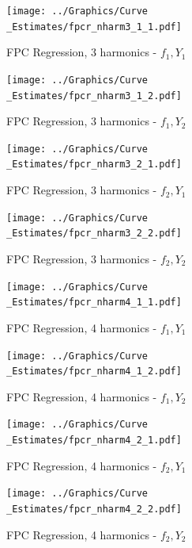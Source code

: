 \documentclass[11pt,twoside,a4paper]{article}
\begin{document}
	\begin{figure}[H]
		\centering
		\begin{minipage}{.5\textwidth}
			\centering
			\texttt{[image: ../Graphics/Curve\\\_Estimates/fpcr\_nharm3\_1\_1.pdf]}
			\caption{FPC Regression, 3 harmonics - $f_1, Y_1$}
			\label{fpcr_nharm3_1_1}
		\end{minipage}%
		\begin{minipage}{.5\textwidth}
			\centering
			\texttt{[image: ../Graphics/Curve\\\_Estimates/fpcr\_nharm3\_1\_2.pdf]}
			\caption{FPC Regression, 3 harmonics - $f_1, Y_2$}
			\label{fpcr_nharm3_1_2}
		\end{minipage}
	\end{figure}
	
	\begin{figure}[H]
		\centering
		\begin{minipage}{.5\textwidth}
			\centering
			\texttt{[image: ../Graphics/Curve\\\_Estimates/fpcr\_nharm3\_2\_1.pdf]}
			\caption{FPC Regression, 3 harmonics - $f_2, Y_1$}
			\label{fpcr_nharm3_2_1}
		\end{minipage}%
		\begin{minipage}{.5\textwidth}
			\centering
			\texttt{[image: ../Graphics/Curve\\\_Estimates/fpcr\_nharm3\_2\_2.pdf]}
			\caption{FPC Regression, 3 harmonics - $f_2, Y_2$}
			\label{fpcr_nharm3_2_2}
		\end{minipage}
	\end{figure}
	
	\begin{figure}[H]
		\centering
		\begin{minipage}{.5\textwidth}
			\centering
			\texttt{[image: ../Graphics/Curve\\\_Estimates/fpcr\_nharm4\_1\_1.pdf]}
			\caption{FPC Regression, 4 harmonics - $f_1, Y_1$}
			\label{fpcr_nharm4_1_1}
		\end{minipage}%
		\begin{minipage}{.5\textwidth}
			\centering
			\texttt{[image: ../Graphics/Curve\\\_Estimates/fpcr\_nharm4\_1\_2.pdf]}
			\caption{FPC Regression, 4 harmonics - $f_1, Y_2$}
			\label{fpcr_nharm4_1_2}
		\end{minipage}
	\end{figure}
	
	\begin{figure}[H]
		\centering
		\begin{minipage}{.5\textwidth}
			\centering
			\texttt{[image: ../Graphics/Curve\\\_Estimates/fpcr\_nharm4\_2\_1.pdf]}
			\caption{FPC Regression, 4 harmonics - $f_2, Y_1$}
			\label{fpcr_nharm4_2_1}
		\end{minipage}%
		\begin{minipage}{.5\textwidth}
			\centering
			\texttt{[image: ../Graphics/Curve\\\_Estimates/fpcr\_nharm4\_2\_2.pdf]}
			\caption{FPC Regression, 4 harmonics - $f_2, Y_2$}
			\label{fpcr_nharm4_2_2}
		\end{minipage}
	\end{figure}
\end{document}
